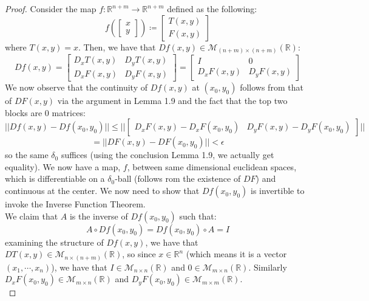 \documentclass[10pt,letterpaper]{article} %
\begin{document}
\begin{proof}
Consider the map $f: \mathbb{R}^{n+m} \xrightarrow{} \mathbb{R}^{n+m}$ defined as the following:
\begin{equation*}
f\left(\begin{bmatrix}
    x\\y
\end{bmatrix}\right) \coloneq \begin{bmatrix}
    T(x, y)\\F(x, y)
\end{bmatrix}
\end{equation*}
where $T(x, y) = x$. Then, we have that $Df(x, y) \in \mathcal{M}_{(n+m)\times (n+m)}(\mathbb{R})$:
\begin{equation*}
Df(x, y) = \begin{bmatrix}
D_xT(x, y) & D_yT(x, y)\\
D_xF(x, y) & D_yF(x, y)
\end{bmatrix} = \begin{bmatrix}
I & 0\\
D_xF(x, y) & D_yF(x, y)
\end{bmatrix}
\end{equation*}
We now observe that the continuity of $Df(x, y)$ at $(x_0, y_0)$ follows from that of $DF(x, y)$ via the argument in Lemma 1.9 and the fact that the top two blocks are $0$ matrices:
\begin{equation*}
||Df(x, y) - Df(x_0, y_0)|| \leqslant ||\begin{bmatrix}
D_xF(x, y) - D_xF(x_0, y_0) & D_yF(x, y) - D_yF(x_0, y_0)
\end{bmatrix}||
\end{equation*}
\begin{equation*}
= ||DF(x, y) - DF(x_0, y_0)|| < \epsilon
\end{equation*}
so the same $\delta_0$ suffices (using the conclusion Lemma 1.9, we actually get equality). We now have a map, $f$, between same dimensional euclidean spaces, which is differentiable on a $\delta_0$-ball (follows rom the existence of $DF$) and continuous at the center. We now need to show that $Df(x_0, y_0)$ is invertible to invoke the Inverse Function Theorem.\\

We claim that $A$ is the inverse of $Df(x_0, y_0)$ such that:
\begin{equation*}
A \circ Df(x_0, y_0) = Df(x_0, y_0) \circ A = I
\end{equation*}
examining the structure of $Df(x, y)$, we have that $DT(x, y) \in \mathcal{M}_{n \times (n+m)}(\mathbb{R})$, so since $x \in \mathbb{R}^n$ (which means it is a vector $(x_1, \cdots, x_n)$), we have that $I \in \mathcal{M}_{n \times n}(\mathbb{R})$ and $0 \in \mathcal{M}_{m \times n}(\mathbb{R})$. Similarly $D_xF(x_0, y_0) \in \mathcal{M}_{m \times n}(\mathbb{R})$ and $D_yF(x_0, y_0) \in \mathcal{M}_{m \times m}(\mathbb{R})$.\\


\end{proof}
\end{document}
